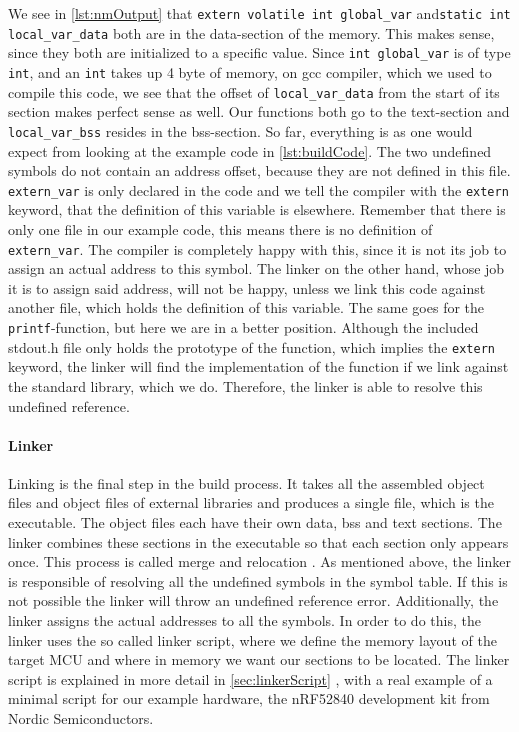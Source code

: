 \documentclass[a4paper,12pt]{article}
\newcommand{\secref}[1]{\autoref{#1} \nameref{#1}}
\newcommand{\inlinec}[1]{\texttt{#1}}
\begin{document}
We see in \autoref{lst:nmOutput} that \inlinec{extern volatile int global_var} and\newline \inlinec{static int local_var_data} both are in the data-section of the memory. This makes sense, since they both are initialized to a specific value. Since \inlinec{int global_var} is of type \inlinec{int}, and an \inlinec{int} takes up 4 byte of memory, on gcc compiler, which we used to compile this code, we see that the offset of \inlinec{local_var_data} from the start of its section makes perfect sense as well. Our functions both go to the text-section and \inlinec{local_var_bss} resides in the bss-section. So far, everything is as one would expect from looking at the example code in \autoref{lst:buildCode}. The two undefined symbols do not contain an address offset, because they are not defined in this file. \inlinec{extern_var} is only declared in the code and we tell the compiler with the \inlinec{extern} keyword, that the definition of this variable is elsewhere. Remember that there is only one file in our example code, this means there is no definition of \inlinec{extern_var}. The compiler is completely happy with this, since it is not its job to assign an actual address to this symbol. The linker on the other hand, whose job it is to assign said address, will not be happy, unless we link this code against another file, which holds the definition of this variable. The same goes for the \inlinec{printf}-function, but here we are in a better position. Although the included stdout.h file only holds the prototype of the function, which implies the \inlinec{extern} keyword, the linker will find the implementation of the function if we link against the standard library, which we do. Therefore, the linker is able to resolve this undefined reference.\newpage

\paragraph{Linker}\label{sec:linker}
Linking is the final step in the build process. It takes all the assembled object files and object files of external libraries and produces a single file, which is the executable. The object files each have their own data, bss and text sections. The linker combines these sections in the executable so that each section only appears once. This process is called merge and relocation \cite{EmbeddedSecurity}. As mentioned above, the linker is responsible of resolving all the undefined symbols in the symbol table. If this is not possible the linker will throw an undefined reference error. Additionally, the linker assigns the actual addresses to all the symbols. In order to do this, the linker uses the so called linker script, where we define the memory layout of the target \ac{MCU} and where in memory we want our sections to be located. The linker script is explained in more detail in \secref{sec:linkerScript}, with a real example of a minimal script for our example hardware, the nRF52840 development kit from Nordic Semiconductors.
\end{document}
